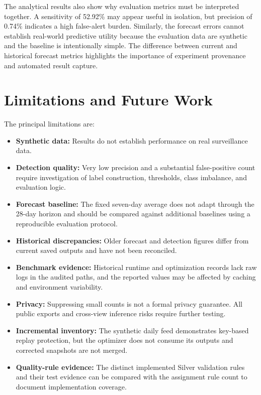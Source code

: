﻿\documentclass[conference]{IEEEtran}
\begin{document}
The analytical results also show why evaluation metrics must be interpreted together. A sensitivity of 52.92\% may appear useful in isolation, but precision of 0.74\% indicates a high false-alert burden. Similarly, the forecast errors cannot establish real-world predictive utility because the evaluation data are synthetic and the baseline is intentionally simple. The difference between current and historical forecast metrics highlights the importance of experiment provenance and automated result capture.

\section{Limitations and Future Work}

The principal limitations are:
\begin{itemize}
    \item \textbf{Synthetic data:} Results do not establish performance on real surveillance data.
    \item \textbf{Detection quality:} Very low precision and a substantial false-positive count require investigation of label construction, thresholds, class imbalance, and evaluation logic.
    \item \textbf{Forecast baseline:} The fixed seven-day average does not adapt through the 28-day horizon and should be compared against additional baselines using a reproducible evaluation protocol.
    \item \textbf{Historical discrepancies:} Older forecast and detection figures differ from current saved outputs and have not been reconciled.
    \item \textbf{Benchmark evidence:} Historical runtime and optimization records lack raw logs in the audited paths, and the reported values may be affected by caching and environment variability.
    \item \textbf{Privacy:} Suppressing small counts is not a formal privacy guarantee. All public exports and cross-view inference risks require further testing.
    \item \textbf{Incremental inventory:} The synthetic daily feed demonstrates key-based replay protection, but the optimizer does not consume its outputs and corrected snapshots are not merged.
    \item \textbf{Quality-rule evidence:} The distinct implemented Silver validation rules and their test evidence can be compared with the assignment rule count to document implementation coverage.
\end{itemize}
\end{document}
